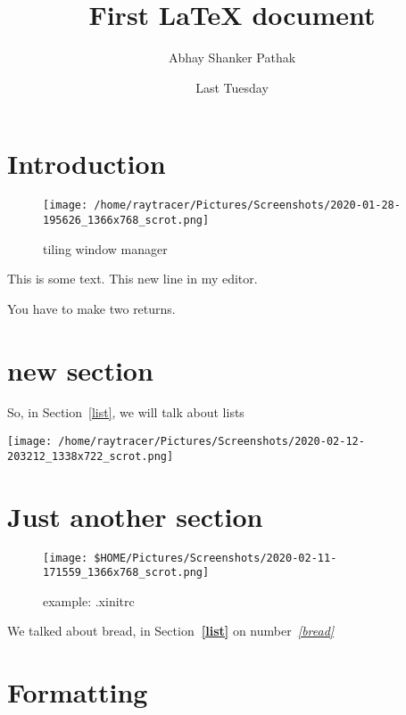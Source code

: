\documentclass{article}	%
\author{Abhay Shanker Pathak}
\title{First {\LaTeX} document}
\date{Last Tuesday}
\begin{document}
\maketitle

\section{Introduction}

	\blindtext
	\blindtext
	\blindtext
	\begin{figure}[h]
	\centering
		\texttt{[image: /home/raytracer/Pictures/Screenshots/2020-01-28-195626\_1366x768\_scrot.png]}
		\caption{tiling window manager}
	\end{figure}
	\blindtext
	\blindtext

	This is some text.
	This new line in my editor.

	You have to make two returns.

\section{new section}

So, in Section~\ref{list}, we will talk about lists

\begin{center}
\texttt{[image: /home/raytracer/Pictures/Screenshots/2020-02-12-203212\_1338x722\_scrot.png]}
\end{center}

\section{Just another section}

\begin{figure}[h]	%
\begin{center}
\texttt{[image: \$HOME/Pictures/Screenshots/2020-02-11-171559\_1366x768\_scrot.png]}
\end{center}
	\caption{example: .xinitrc}
\end{figure}

We talked about bread, in Section\textbf{~\ref{list}} on number\emph{~\ref{bread}}

\section{Formatting}
\end{document}
